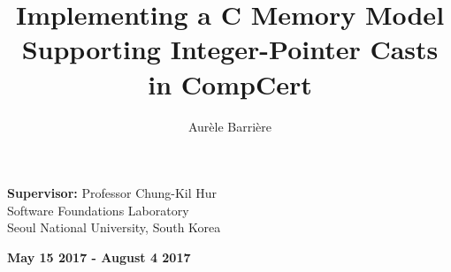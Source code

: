 \documentclass{llncs2e/llncs}
\begin{document}
\setcounter{page}{0}
%
\pagestyle{headings}  %
%
\title{Implementing a C Memory Model Supporting Integer-Pointer Casts in CompCert}
%
\author{Aur\`ele Barri\`ere}
%
%

\maketitle              %

\hrulefill

\begin{center}
  \textbf{Supervisor: } Professor Chung-Kil Hur\\
  Software Foundations Laboratory\\
  Seoul National University, South Korea
\end{center}

\hrulefill

\begin{center}
  \textbf{May 15 2017 - August 4 2017}
\end{center}
\end{document}
